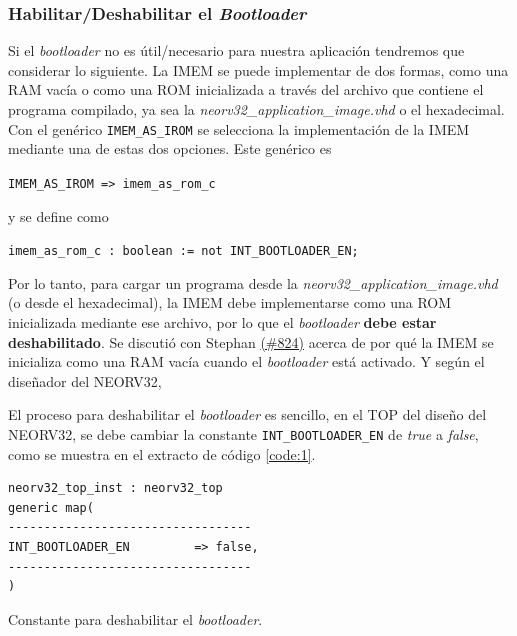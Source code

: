 \subsubsection{Habilitar/Deshabilitar el \textit{Bootloader}}

Si el \textit{bootloader} no es útil/necesario para nuestra aplicación tendremos que considerar lo siguiente.
La IMEM se puede implementar de dos formas, como una RAM vacía o como una ROM inicializada a través del archivo que contiene el programa compilado, ya sea la \textit{neorv32\_application\_image.vhd} o el hexadecimal. 
Con el genérico \texttt{IMEM_AS_IROM} se selecciona la implementación de la IMEM mediante una de estas dos opciones. 
Este genérico es
 
\hspace{35mm} {\texttt{IMEM_AS_IROM => imem_as_rom_c} }

\noindent y se define como 

\hspace{17mm} \texttt{imem_as_rom_c : boolean := not INT_BOOTLOADER_EN;}

\noindent Por lo tanto, para cargar un programa desde la \textit{neorv32\_application\_image.vhd} (o desde el hexadecimal), la IMEM debe implementarse como una ROM inicializada mediante ese archivo, por lo que el \textit{bootloader} \textbf{debe estar deshabilitado}.
Se discutió con Stephan \href{https://github.com/stnolting/neorv32/discussions/824}{(\#824)} acerca de por qué la IMEM se inicializa como una RAM vacía cuando el \textit{bootloader} está activado. 
Y según el diseñador del NEORV32, 

El proceso para deshabilitar el \textit{bootloader} es sencillo, en el TOP del diseño del NEORV32, se debe cambiar la constante \texttt{INT_BOOTLOADER_EN} de \textit{true} a \textit{false}, como se muestra en el extracto de código \ref{code:1}.

\begin{listing}[h!]
\begin{verbatim}
neorv32_top_inst : neorv32_top
generic map(
----------------------------------
INT_BOOTLOADER_EN         => false,
----------------------------------
)
\end{verbatim}
\caption{Constante para deshabilitar el \textit{bootloader}.}
\label{code:1}
\end{listing}

